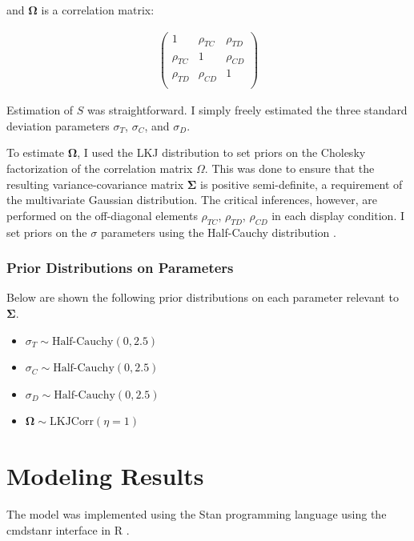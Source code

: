 and $\boldsymbol{\Omega}$ is a correlation matrix:

\begin{align}
   \begin{pmatrix}
      1 & \rho_{TC} & \rho_{TD} \\
      \rho_{TC} & 1 & \rho_{CD} \\
      \rho_{TD} & \rho_{CD} & 1 \\
   \end{pmatrix}
   \label{eqn:O}
\end{align}

Estimation of $S$ was straightforward. I simply freely estimated the three standard deviation parameters $\sigma_{T}$, $\sigma_{C}$, and $\sigma_{D}$.

To estimate $\boldsymbol{\Omega}$, I used the LKJ distribution \parencite{lewandowski2009generating} to set priors on the Cholesky factorization of the correlation matrix $\Omega$. This was done to ensure that the resulting variance-covariance matrix $\boldsymbol{\Sigma}$ is positive semi-definite, a requirement of the multivariate Gaussian distribution. The critical inferences, however, are performed on the off-diagonal elements $\rho_{TC}$, $\rho_{TD}$, $\rho_{CD}$ in each display condition. I set priors on the $\sigma$ parameters using the Half-Cauchy distribution \parencite{gelman2006prior}. 

\subsubsection{Prior Distributions on Parameters}
Below are shown the following prior distributions on each parameter relevant to $\boldsymbol{\Sigma}$.
\begin{itemize}
    \item $\sigma_{T} \sim\text{Half-Cauchy}(0,2.5)$
    \item $\sigma_{C} \sim\text{Half-Cauchy}(0,2.5)$
    \item $\sigma_{D} \sim\text{Half-Cauchy}(0,2.5)$
    \item $\boldsymbol{\Omega} \sim \text{LKJCorr}(\eta=1)$
\end{itemize}

\section{Modeling Results}
The model was implemented using the Stan programming language \parencite{carpenter2017stan} using the cmdstanr interface \parencite{cmdstanr} in R . 

